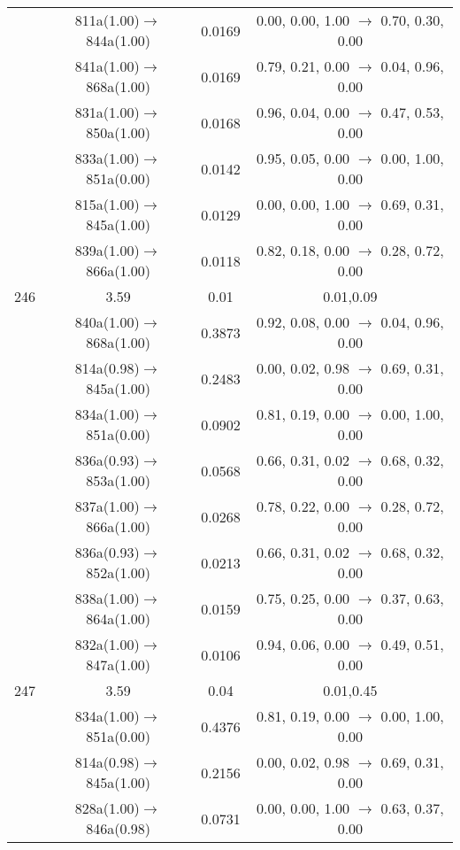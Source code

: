 \documentclass[10pt,a4paper]{article}
\begin{document}
\begin{longtable}{c|c|c|c}
 	& 811a(1.00)$\rightarrow$844a(1.00) &	 0.0169 &	 0.00, 0.00, 1.00 $\rightarrow$ 0.70, 0.30, 0.00 \\ 
 	& 841a(1.00)$\rightarrow$868a(1.00) &	 0.0169 &	 0.79, 0.21, 0.00 $\rightarrow$ 0.04, 0.96, 0.00 \\ 
 	& 831a(1.00)$\rightarrow$850a(1.00) &	 0.0168 &	 0.96, 0.04, 0.00 $\rightarrow$ 0.47, 0.53, 0.00 \\ 
 	& 833a(1.00)$\rightarrow$851a(0.00) &	 0.0142 &	 0.95, 0.05, 0.00 $\rightarrow$ 0.00, 1.00, 0.00 \\ 
 	& 815a(1.00)$\rightarrow$845a(1.00) &	 0.0129 &	 0.00, 0.00, 1.00 $\rightarrow$ 0.69, 0.31, 0.00 \\ 
 	& 839a(1.00)$\rightarrow$866a(1.00) &	 0.0118 &	 0.82, 0.18, 0.00 $\rightarrow$ 0.28, 0.72, 0.00 \\ 
 \hline246 &	 3.59 &	 0.01 &	 0.01,0.09 \\ 
  	& 840a(1.00)$\rightarrow$868a(1.00) &	 0.3873 &	 0.92, 0.08, 0.00 $\rightarrow$ 0.04, 0.96, 0.00 \\ 
 	& 814a(0.98)$\rightarrow$845a(1.00) &	 0.2483 &	 0.00, 0.02, 0.98 $\rightarrow$ 0.69, 0.31, 0.00 \\ 
 	& 834a(1.00)$\rightarrow$851a(0.00) &	 0.0902 &	 0.81, 0.19, 0.00 $\rightarrow$ 0.00, 1.00, 0.00 \\ 
 	& 836a(0.93)$\rightarrow$853a(1.00) &	 0.0568 &	 0.66, 0.31, 0.02 $\rightarrow$ 0.68, 0.32, 0.00 \\ 
 	& 837a(1.00)$\rightarrow$866a(1.00) &	 0.0268 &	 0.78, 0.22, 0.00 $\rightarrow$ 0.28, 0.72, 0.00 \\ 
 	& 836a(0.93)$\rightarrow$852a(1.00) &	 0.0213 &	 0.66, 0.31, 0.02 $\rightarrow$ 0.68, 0.32, 0.00 \\ 
 	& 838a(1.00)$\rightarrow$864a(1.00) &	 0.0159 &	 0.75, 0.25, 0.00 $\rightarrow$ 0.37, 0.63, 0.00 \\ 
 	& 832a(1.00)$\rightarrow$847a(1.00) &	 0.0106 &	 0.94, 0.06, 0.00 $\rightarrow$ 0.49, 0.51, 0.00 \\ 
 \hline247 &	 3.59 &	 0.04 &	 0.01,0.45 \\ 
  	& 834a(1.00)$\rightarrow$851a(0.00) &	 0.4376 &	 0.81, 0.19, 0.00 $\rightarrow$ 0.00, 1.00, 0.00 \\ 
 	& 814a(0.98)$\rightarrow$845a(1.00) &	 0.2156 &	 0.00, 0.02, 0.98 $\rightarrow$ 0.69, 0.31, 0.00 \\ 
 	& 828a(1.00)$\rightarrow$846a(0.98) &	 0.0731 &	 0.00, 0.00, 1.00 $\rightarrow$ 0.63, 0.37, 0.00 \\ 

\end{longtable}
\end{document}
